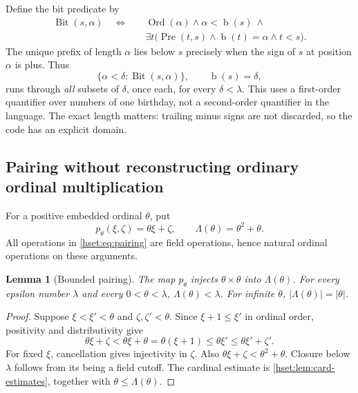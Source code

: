 \documentclass[11pt,letterpaper]{article}
\newtheorem{lemma}[lemma]{Lemma}\aliascntresetthe{lemma}
\theoremstyle{definition}
\theoremstyle{remark}
\newcommand{\Ord}{\operatorname{Ord}}
\newcommand{\bd}{\operatorname{b}}
\newcommand{\Bit}{\operatorname{Bit}}
\newcommand{\Pre}{\operatorname{Pre}}
\newcommand{\card}[1]{\lvert#1\rvert}
\begin{document}
Define the bit predicate by
\begin{align}
 \Bit(s,\alpha)\quad\Longleftrightarrow\quad &
 \Ord(\alpha)\land\alpha<\bd(s)\ \land\nonumber\\
 &\exists t\bigl(\Pre(t,s)\land\bd(t)=\alpha\land t<s\bigr).
 \label{hset:eq:bit}
\end{align}
The unique prefix of length $\alpha$ lies below $s$ precisely when the sign
of $s$ at position $\alpha$ is plus. Thus
\begin{equation}
 \{\alpha<\delta:\Bit(s,\alpha)\},\qquad\bd(s)=\delta,
 \label{hset:eq:fiber-subsets}
\end{equation}
runs through \emph{all} subsets of $\delta$, once each, for every
$\delta<\lambda$. This uses a first-order quantifier over numbers of one
birthday, not a second-order quantifier in the language. The exact length
matters: trailing minus signs are not discarded, so the code has an explicit
domain.

\subsection{Pairing without reconstructing ordinary ordinal multiplication}

For a positive embedded ordinal $\theta$, put
\begin{equation}
 p_\theta(\xi,\zeta)=\theta\xi+\zeta,
 \qquad \Lambda(\theta)=\theta^2+\theta.
 \label{hset:eq:pairing}
\end{equation}
All operations in \eqref{hset:eq:pairing} are field operations, hence natural
ordinal operations on these arguments.

\begin{lemma}[Bounded pairing]
\label{hset:lem:pairing}
The map $p_\theta$ injects $\theta\times\theta$ into $\Lambda(\theta)$.
For every epsilon number $\lambda$ and every $0<\theta<\lambda$,
$\Lambda(\theta)<\lambda$. For infinite $\theta$,
$\card{\Lambda(\theta)}=\card\theta$.
\end{lemma}
\begin{proof}
Suppose $\xi<\xi'<\theta$ and $\zeta,\zeta'<\theta$. Since
$\xi+1\le\xi'$ in ordinal order, positivity and distributivity give
\[
 \theta\xi+\zeta<\theta\xi+\theta
 =\theta(\xi+1)\le\theta\xi'\le\theta\xi'+\zeta'.
\]
For fixed $\xi$, cancellation gives injectivity in $\zeta$. Also
$\theta\xi+\zeta<\theta^2+\theta$. Closure below $\lambda$ follows from its
being a field cutoff. The cardinal estimate is
\cref{hset:lem:card-estimates}, together with $\theta\le\Lambda(\theta)$.
\end{proof}
\end{document}
